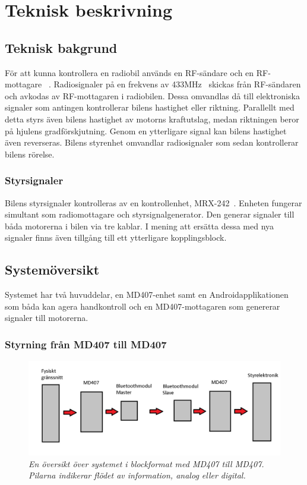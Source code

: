 \documentclass[a4paper]{article}
\begin{document}
\newpage
\section{Teknisk beskrivning}

\subsection{Teknisk bakgrund}
För att kunna kontrollera en radiobil används en RF-sändare och en RF-mottagare ~\cite{RCTechnique}. Radiosignaler på en frekvens av 433MHz~\cite{RFModule} skickas från RF-sändaren och avkodas av RF-mottagaren i radiobilen. Dessa omvandlas då till elektroniska signaler som antingen kontrollerar bilens hastighet eller riktning. Parallellt med detta styrs även bilens hastighet av motorns kraftutslag, medan riktningen beror på hjulens gradförskjutning. Genom en ytterligare signal kan bilens hastighet även reverseras. Bilens styrenhet omvandlar radiosignaler som sedan kontrollerar bilens rörelse.

\subsubsection{Styrsignaler}
Bilens styrsignaler kontrolleras av en kontrollenhet, MRX-242~\cite{projektDir}. Enheten fungerar simultant som radiomottagare och styrsignalgenerator. Den generar signaler till båda motorerna i bilen via tre kablar. I mening att ersätta dessa med nya signaler finns även tillgång till ett ytterligare kopplingsblock.


\subsection{Systemöversikt}
Systemet har två huvuddelar, en MD407-enhet samt en Androidapplikationen som båda kan agera handkontroll och en MD407-mottagaren som genererar signaler till motorerna.

\subsubsection{Styrning från MD407 till MD407}
\begin{figure}[H]
\includegraphics[width=\textwidth]{systemoversikt.jpg}
\centering
\caption{\it En översikt över systemet i blockformat med MD407 till MD407. Pilarna indikerar flödet av information, analog eller digital.}
\end{figure} 
\end{document}
